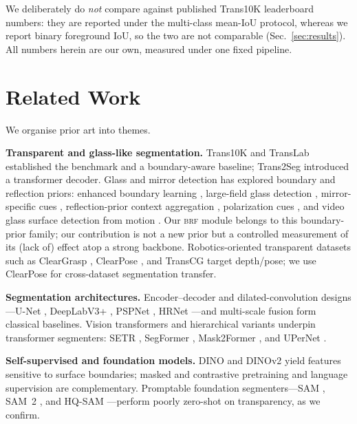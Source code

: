\documentclass{bmvc2k}
\newcommand{\brf}{\textsc{brf}}
\newcommand{\dinov}{DINOv2}
\newcommand{\iou}{IoU}
\begin{document}
We deliberately do \emph{not} compare against published Trans10K leaderboard
numbers: they are reported under the multi-class mean-\iou{} protocol, whereas we
report binary foreground \iou, so the two are not comparable
(Sec.~\ref{sec:results}). All numbers herein are our own, measured under one
fixed pipeline.

\section{Related Work}
We organise prior art into themes.

\textbf{Transparent and glass-like segmentation.} Trans10K and TransLab
\cite{xie2020translab} established the benchmark and a boundary-aware baseline;
Trans2Seg \cite{xie2021trans2seg} introduced a transformer decoder. Glass and
mirror detection has explored boundary and reflection priors: enhanced boundary
learning \cite{he2021eblnet}, large-field glass detection \cite{mei2020gdnet},
mirror-specific cues \cite{yang2019mirrornet}, reflection-prior context
aggregation \cite{lin2021gsd}, polarization cues
\cite{mei2022polarization}, and video glass surface detection from motion
\cite{liu2024vgsd}. Our \brf{} module belongs to this boundary-prior
family; our contribution is not a new prior but a controlled measurement of its
(lack of) effect atop a strong backbone. Robotics-oriented transparent datasets
such as ClearGrasp \cite{sajjan2020cleargrasp}, ClearPose
\cite{chen2022clearpose}, and TransCG \cite{fang2022transcg} target depth/pose;
we use ClearPose for cross-dataset segmentation transfer.

\textbf{Segmentation architectures.} Encoder--decoder and dilated-convolution
designs---U-Net \cite{ronneberger2015unet}, DeepLabV3+
\cite{chen2018deeplabv3plus}, PSPNet \cite{zhao2017pspnet}, HRNet
\cite{wang2020hrnet}---and multi-scale fusion \cite{lin2017fpn} form classical
baselines. Vision transformers \cite{dosovitskiy2021vit} and hierarchical
variants \cite{liu2021swin} underpin transformer segmenters: SETR
\cite{zheng2021setr}, SegFormer \cite{xie2021segformer}, Mask2Former
\cite{cheng2022mask2former}, and UPerNet \cite{xiao2018upernet}.

\textbf{Self-supervised and foundation models.} DINO \cite{caron2021dino} and
\dinov{} \cite{oquab2023dinov2} yield features sensitive to surface boundaries;
masked \cite{he2022mae} and contrastive \cite{he2020moco} pretraining and
language supervision \cite{radford2021clip} are complementary. Promptable
foundation segmenters---SAM \cite{kirillov2023sam}, SAM~2
\cite{ravi2024sam2}, and HQ-SAM \cite{ke2023hqsam}---perform poorly zero-shot on
transparency, as we confirm.
\end{document}
